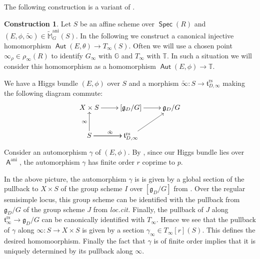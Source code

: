 \documentclass{article}
\DeclareMathOperator{\A}{\mathsf{A}}
\DeclareMathOperator{\ani}{ani}
\DeclareMathOperator{\Aut}{\mathsf{Aut}}
\DeclareMathOperator{\Spec}{\mathsf{Spec}}
\newcommand{\BG}{{\mathbb{G}}}
\newcommand{\BT}{{\mathbb{T}}}
\theoremstyle{definition}
\newtheorem{construction}[definition]{Construction}
\theoremstyle{plain}
\begin{document}
The following construction is a variant of  \cite[Corollaire 4.11.3]{MR2653248}.

\begin{construction}\label{cons:auto_torus}
Let $S$ be an affine scheme over $\Spec(R)$ and $(E,\phi,\tilde\infty) \in \widetilde{\mathbb{M}}^{\ani}_G(S)$. In the following we construct a canonical injective homomorphism $\Aut(E,\theta) \to T_{\infty}(S)$. Often we will use a chosen point $\infty_\rho \in \rho_\infty(R)$ to identify $G_\infty$ with $\BG$ and $T_\infty$ with $\BT$. In such a situation we will consider this homomorphism as a homomorphism $\Aut(E,\phi) \to \BT$.

We have a Higgs bundle $(E,\phi)$ over $S$ and a morphism $\tilde \infty\colon S \to \mathfrak{t}^\text{rs}_{D,\infty}$ making the following diagram commute:
\begin{equation} \label{SomeDiag}
  \xymatrix{
    X \times S \ar[r] & [\mathfrak{g}_D/G] \ar[r] & \mathfrak{g}_D/G \\
    S \ar[u]^\infty \ar[r]^{\tilde\infty} \ar[r] & \mathfrak{t}^\text{rs}_{D,\infty} \ar[ru] 
  }
\end{equation}
Consider an automorphism $\gamma$ of $(E,\phi)$. By \cite[4.11.4]{MR2653248}, since our Higgs bundle lies over $\A^{\ani}$, the automorphism $\gamma$ has finite order $r$ coprime to $p$. 

In the above picture, the automorphism $\gamma$ is is given by a global section of the pullback to $X \times S$ of the group scheme $I$ over $[\mathfrak{g}_D/G]$ from \cite[2.1]{MR2653248}. Over the regular semisimple locus, this group scheme can be identified with the pullback from $\mathfrak{g}_D/G$ of the group scheme $J$ from \emph{loc.cit.} Finally, the pullback of $J$ along $\mathfrak{t}^\text{rs}_\infty \to \mathfrak{g}_D/G$ can be canonically identified with $T_\infty$. Hence we see that the pullback of $\gamma$ along $\infty\colon S \to X \times S$ is given by a section $\gamma_\infty \in T_\infty[r](S)$. This defines the desired homomoorphism. Finally the fact that $\gamma$ is of finite order implies that it is uniquely determined by its pullback along $\infty$.
\end{construction}
\end{document}
